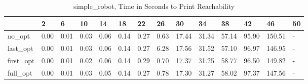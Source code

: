 \begin{table}
\caption{simple_robot, Time in Seconds to Print Reachability}
\label{simple_robot_states_time}
\begin{tabular}{llllllllllllll}
\toprule
 & 2 & 6 & 10 & 14 & 18 & 22 & 26 & 30 & 34 & 38 & 42 & 46 & 50 \\
\midrule
no_opt & 0.00 & 0.01 & 0.03 & 0.06 & 0.14 & 0.27 & 0.63 & 17.44 & 31.34 & 57.14 & 95.90 & 150.51 & - \\
last_opt & 0.00 & 0.01 & 0.03 & 0.06 & 0.14 & 0.27 & 6.28 & 17.56 & 31.52 & 57.10 & 96.97 & 146.95 & - \\
first_opt & 0.00 & 0.01 & 0.02 & 0.06 & 0.14 & 0.29 & 0.70 & 17.37 & 31.25 & 58.77 & 96.50 & 149.82 & - \\
full_opt & 0.00 & 0.01 & 0.03 & 0.05 & 0.14 & 0.27 & 0.78 & 17.30 & 31.27 & 58.02 & 97.37 & 147.56 & - \\
\bottomrule
\end{tabular}
\end{table}
